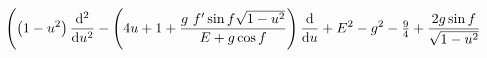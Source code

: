 \begin{equation}
\nonumber
\left( \left(1-u^2 \right) \frac{{\rm d}^2}{{\rm d}u^2} 
- \left(4 u +1+ \frac{g~f^\prime \sin f \sqrt{1-u^2}}{E + g \cos f}
\right) \frac{{\rm d}}{{\rm d}u} +
E^2 -g^2   - \tfrac{9}{4}
+ \frac{2g \sin f}{\sqrt{1-u^2}} 
\right.  
\end{equation}

